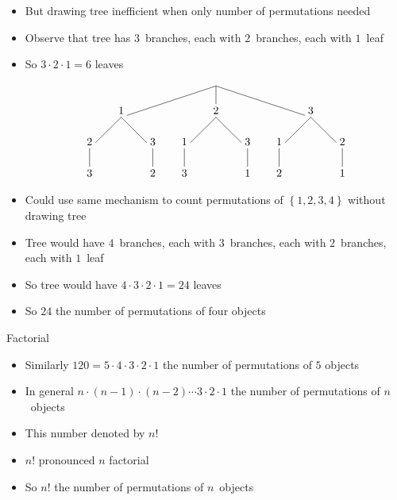 \documentclass[handout]{beamer}
\theoremstyle{definition}
\begin{document}
\begin{frame}
\begin{itemize}
\item But drawing tree inefficient when only
\alert{number} of permutations needed
\item Observe that tree has $3$~branches,
each with $2$~branches, each with $1$~leaf
\item So $3\cdot 2\cdot 1=6$ leaves
\[\begin{xy}<1cm,0cm>:
(0,0)="0";
(-3,-1)="-31";
(0,-1)="01";
(3,-1)="31";
"0";"-31"*+!D{1}**\dir{-};
"0";"01"*+!D{2}**\dir{-};
"0";"31"*+!D{3}**\dir{-};
"-31";(-4,-2)*+!D{2}**\dir{-};
(-4,-3)*+!D{3}**\dir{-};
"-31";(-2,-2)*+!D{3}**\dir{-};
(-2,-3)*+!D{2}**\dir{-};
"01";(-1,-2)*+!D{1}**\dir{-};
(-1,-3)*+!D{3}**\dir{-};
"01";(1,-2)*+!D{3}**\dir{-};
(1,-3)*+!D{1}**\dir{-};
"31";(2,-2)*+!D{1}**\dir{-};
(2,-3)*+!D{2}**\dir{-};
"31";(4,-2)*+!D{2}**\dir{-};
(4,-3)*+!D{1}**\dir{-};
\end{xy}\]
\item Could use same mechanism to count permutations
of $\left\{1,2,3,4\right\}$ without drawing tree
\item Tree would have $4$~branches, each with $3$~branches,
each with $2$~branches, each with $1$~leaf
\item So tree would have $4\cdot 3\cdot 2\cdot 1=24$ leaves
\item So $24$ the number of permutations of four objects
\end{itemize}
\end{frame}

\begin{frame}{Factorial}
\begin{itemize}
\item Similarly $120=5\cdot 4\cdot 3\cdot 2\cdot 1$
the number of permutations of $5$ objects
\item In general $n\cdot\left(n-1\right)\cdot\left(n-2\right)
\cdots 3\cdot 2\cdot 1$ the number of permutations of $n$~objects
\item This number denoted by $n!$
\item $n!$ pronounced \alert{$n$ factorial}
\item So $n!$ the number of permutations of $n$~objects
\end{itemize}
\end{frame}
\end{document}
